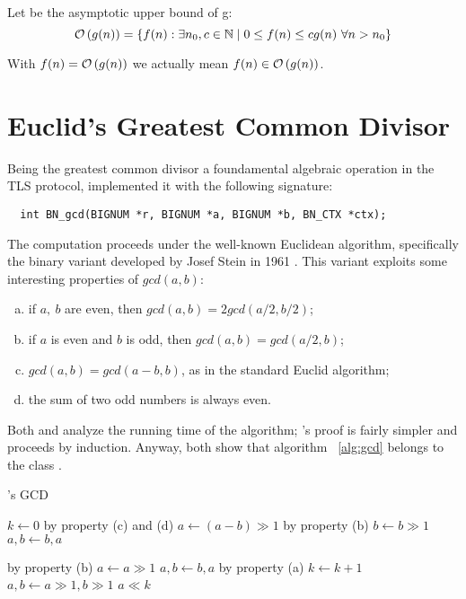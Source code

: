 Let  be the asymptotic upper bound of g:
$$
\mathcal{O}\left(g(n)\right) = \{ f(n) : \exists n_0, c \in \mathbb{N} \mid 0 \leq f(n) \leq cg(n)
\ \forall n > n_0 \}
$$

With $f(n) = \mathcal{O}\left(g(n)\right)$ we actually mean
$f(n) \in \mathcal{O}\left(g(n)\right)$.

\section{Euclid's Greatest Common Divisor \label{sec:preq:gcd}}

Being the greatest common divisor a foundamental algebraic operation in the TLS
protocol, \openssl implemented it with the following signature:

\begin{verbatim}
  int BN_gcd(BIGNUM *r, BIGNUM *a, BIGNUM *b, BN_CTX *ctx);
\end{verbatim}

The computation proceeds under the well-known Euclidean algorithm, specifically
the binary variant developed by Josef Stein in 1961 \cite{AOCPv2}. This variant
exploits some interesting properties of $gcd(a, b)$:
\begin{enumerate}[(a)]
  \setlength{\itemsep}{1pt}
  \item if $a,\ b$ are even, then $gcd(a, b) = 2gcd(a/2, b/2)$;
  \item if $a$ is even and $b$ is odd, then $gcd(a, b) = gcd(a/2, b)$;
  \item  $gcd(a, b) = gcd(a-b, b)$, as in the standard Euclid algorithm;
  \item the sum of two odd numbers is always even.
\end{enumerate}

Both \cite{AOCPv2} and \cite{MITalg} analyze the running time of the
algorithm; \cite{MITalg}'s proof is fairly simpler and proceeds %
by induction.
Anyway, both show that algorithm ~\ref{alg:gcd} belongs to the class
.

\begin{algorithm}[H]
  \caption{\openssl's GCD \label{alg:gcd}}
  \begin{algorithmic}[1]
    \State $k \gets 0$
          \Comment by property (c) and (d)
          \State $a \gets (a-b) \gg 1$
        \Else
          \Comment by property (b)
          \State $b \gets b \gg 1$
        \EndIf
         $a, b \gets b, a$ \EndIf

      \Else
        \Comment by property (b)
          \State $a \gets a \gg 1$
           $a, b \gets b, a$ \EndIf
        \Else
        \Comment by property (a)
          \State $k \gets k+1$
          \State $a, b \gets a \gg 1, b \gg 1$
        \EndIf
      \EndIf
    \EndWhile
    \State \Return $a \ll k$
    \EndFunction
  \end{algorithmic}
\end{algorithm}


